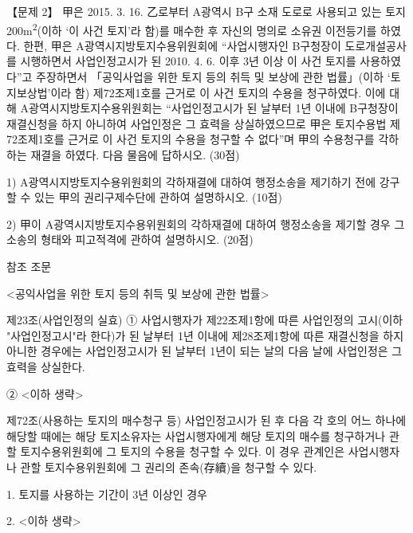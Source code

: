 \begin{longquestion}{【문제 2】}
甲은 2015. 3. 16. 乙로부터 A광역시 B구 소재 도로로 사용되고 있는 토지 200m\textsuperscript{2}(이하 ‘이 사건 토지’라 함)를 매수한 후 자신의 명의로 소유권 이전등기를 하였다. 한편, 甲은 A광역시지방토지수용위원회에 “사업시행자인 B구청장이 도로개설공사를 시행하면서 사업인정고시가 된 2010. 4. 6. 이후 3년 이상 이 사건 토지를 사용하였다”고 주장하면서 「공익사업을 위한 토지 등의 취득 및 보상에 관한 법률」(이하 ‘토지보상법’이라 함) 제72조제1호를 근거로 이 사건 토지의 수용을 청구하였다. 이에 대해 A광역시지방토지수용위원회는 “사업인정고시가 된 날부터 1년 이내에 B구청장이 재결신청을 하지 아니하여 사업인정은 그 효력을 상실하였으므로 甲은 토지수용법 제72조제1호를 근거로 이 사건 토지의 수용을 청구할 수 없다”며 甲의 수용청구를 각하하는 재결을 하였다. 다음 물음에 답하시오. (30점) \par
1) A광역시지방토지수용위원회의 각하재결에 대하여 행정소송을 제기하기 전에 강구할 수 있는 甲의 권리구제수단에 관하여 설명하시오. (10점) \par
2) 甲이 A광역시지방토지수용위원회의 각하재결에 대하여 행정소송을 제기할 경우 그 소송의 형태와 피고적격에 관하여 설명하시오. (20점) \par
\begin{framedtext}
참조 조문 \par
<공익사업을 위한 토지 등의 취득 및 보상에 관한 법률> \par
제23조(사업인정의 실효) ① 사업시행자가 제22조제1항에 따른 사업인정의 고시(이하 "사업인정고시"라 한다)가 된 날부터 1년 이내에 제28조제1항에 따른 재결신청을 하지 아니한 경우에는 사업인정고시가 된 날부터 1년이 되는 날의 다음 날에 사업인정은 그 효력을 상실한다. \par
② <이하 생략> \par
제72조(사용하는 토지의 매수청구 등) 사업인정고시가 된 후 다음 각 호의 어느 하나에 해당할 때에는 해당 토지소유자는 사업시행자에게 해당 토지의 매수를 청구하거나 관할 토지수용위원회에 그 토지의 수용을 청구할 수 있다. 이 경우 관계인은 사업시행자나 관할 토지수용위원회에 그 권리의 존속(存續)을 청구할 수 있다. \par
1. 토지를 사용하는 기간이 3년 이상인 경우 \par
2. <이하 생략> \par
\end{framedtext}
\end{longquestion}
